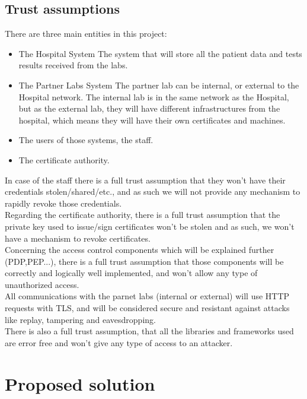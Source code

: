 \subsection{Trust assumptions}


There are three main entities in this project:\\
\begin{itemize}
	\item The Hospital System
		\subitem The system that will store all the patient data and tests results received from the labs.
	\item The Partner Labs System
		\subitem The partner lab can be internal, or external to the Hospital network. The internal lab is in the same network as the Hospital, but as the external lab, they will have different infrastructures from the hospital, which means they will have their own certificates and machines.
	\item The users of those systems, the staff.
	\item The certificate authority.
\end{itemize}

In case of the staff there is a full trust assumption that they won't have their credentials stolen/shared/etc., and as such we will not provide any mechanism to rapidly revoke those credentials. \\

Regarding the certificate authority, there is a full trust assumption that the private key used to issue/sign certificates won't be stolen and as such, we won't have a mechanism to revoke certificates. \\

Concerning the access control components which will be explained further (PDP,PEP...), there is a full trust assumption that those components will be correctly and logically well implemented, and won't allow any type of unauthorized access. \\

All communications with the parnet labs (internal or external) will use HTTP requests with TLS, and will be considered secure and resistant against attacks like replay, tampering and eavesdropping. \\

There is also a full trust assumption, that all the libraries and frameworks used are error free and won't give any type of access to an attacker. \\


\section{Proposed solution}

